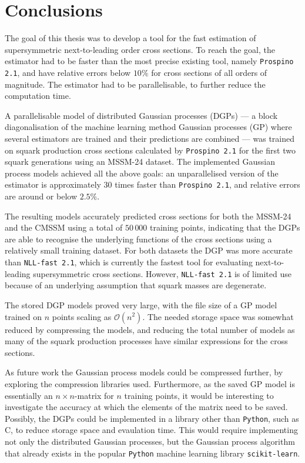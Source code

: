 \documentclass[twoside,english]{uiofysmaster}
\newcommand\CC{C\nolinebreak[4]\hspace{-.05em}\raisebox{.4ex}{\relsize{-3}{\textbf{++}}}\;}
\begin{document}
{{\chapter*{Conclusions}

The goal of this thesis was to develop a tool for the fast estimation of supersymmetric next-to-leading order cross sections. To reach the goal, the estimator had to be faster than the most precise existing tool, namely \verb|Prospino 2.1|, and have relative errors below $10 \%$ for cross sections of all orders of magnitude. The estimator had to be parallelisable, to further reduce the computation time. 

A parallelisable model of distributed Gaussian processes (DGPs) --- a block diagonalisation of the machine learning method Gaussian processes (GP) where several estimators are trained and their predictions are combined --- was trained on squark production cross sections calculated by \verb|Prospino 2.1| for the first two squark generations using an MSSM-24 dataset. The implemented Gaussian process models achieved all the above goals: an unparallelised version of the estimator is approximately 30 times faster than \verb|Prospino 2.1|, and relative errors are around or below $2.5 \%$.  

The resulting models accurately predicted cross sections for both the MSSM-24 and the CMSSM using a total of $50\,000$ training points, indicating that the DGPs are able to recognise the underlying functions of the cross sections using a relatively small training dataset. For both datasets the DGP was more accurate than \verb|NLL-fast 2.1|, which is currently the fastest tool for evaluating next-to-leading supersymmetric cross sections. However, \verb|NLL-fast 2.1| is of limited use because of an underlying assumption that squark masses are degenerate. 

The stored DGP models proved very large, with the file size of a GP model trained on $n$ points scaling as $\mathcal{O}(n^2)$. The needed storage space was somewhat reduced by compressing the models, and reducing the total number of models as many of the squark production processes have similar expressions for the cross sections. 

As future work the Gaussian process models could be compressed further, by exploring the compression libraries used. Furthermore, as the saved GP model is essentially an $n \times n$-matrix for $n$ training points, it would be interesting to investigate the accuracy at which the elements of the matrix need to be saved. Possibly, the DGPs could be implemented in a library other than \verb|Python|, such as \CC, to reduce storage space and evaulation time. This would require implementing not only the distributed Gaussian processes, but the Gaussian process algorithm that already exists in the popular \verb|Python| machine learning library \verb|scikit-learn|.

}}
\end{document}
